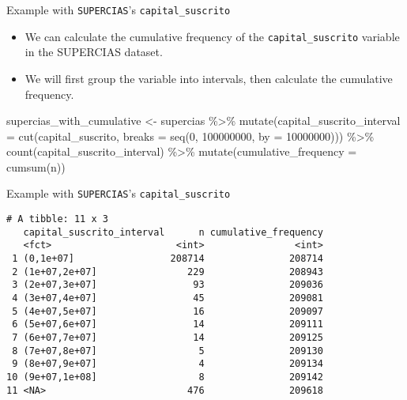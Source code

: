 \documentclass[
  10pt,
  ignorenonframetext,
]{beamer}
\newenvironment{Shaded}{\begin{snugshade}}{\end{snugshade}}
\newcommand{\AttributeTok}[1]{\textcolor[rgb]{0.40,0.45,0.13}{#1}}
\newcommand{\DecValTok}[1]{\textcolor[rgb]{0.68,0.00,0.00}{#1}}
\newcommand{\FunctionTok}[1]{\textcolor[rgb]{0.28,0.35,0.67}{#1}}
\newcommand{\NormalTok}[1]{\textcolor[rgb]{0.00,0.23,0.31}{#1}}
\newcommand{\OtherTok}[1]{\textcolor[rgb]{0.00,0.23,0.31}{#1}}
\newcommand{\SpecialCharTok}[1]{\textcolor[rgb]{0.37,0.37,0.37}{#1}}
\begin{document}
\begin{frame}[fragile]{Example with \texttt{SUPERCIAS}'s
\texttt{capital\_suscrito}}
\label{example-with-superciass-capital_suscrito}
\begin{itemize}
\item
  We can calculate the cumulative frequency of the
  \texttt{capital\_suscrito} variable in the SUPERCIAS dataset.
\item
  We will first group the variable into intervals, then calculate the
  cumulative frequency.
\end{itemize}

\begin{Shaded}
\begin{Highlighting}[]
\NormalTok{supercias\_with\_cumulative }\OtherTok{\textless{}{-}}
\NormalTok{    supercias }\SpecialCharTok{\%\textgreater{}\%} 
    \FunctionTok{mutate}\NormalTok{(}\AttributeTok{capital\_suscrito\_interval =} \FunctionTok{cut}\NormalTok{(capital\_suscrito, }\AttributeTok{breaks =} \FunctionTok{seq}\NormalTok{(}\DecValTok{0}\NormalTok{, }\DecValTok{100000000}\NormalTok{, }\AttributeTok{by =} \DecValTok{10000000}\NormalTok{))) }\SpecialCharTok{\%\textgreater{}\%} 
    \FunctionTok{count}\NormalTok{(capital\_suscrito\_interval) }\SpecialCharTok{\%\textgreater{}\%} 
    \FunctionTok{mutate}\NormalTok{(}\AttributeTok{cumulative\_frequency =} \FunctionTok{cumsum}\NormalTok{(n))}
\end{Highlighting}
\end{Shaded}
\end{frame}

\begin{frame}[fragile]{Example with \texttt{SUPERCIAS}'s
\texttt{capital\_suscrito}}
\label{example-with-superciass-capital_suscrito-1}
\begin{verbatim}
# A tibble: 11 x 3
   capital_suscrito_interval      n cumulative_frequency
   <fct>                      <int>                <int>
 1 (0,1e+07]                 208714               208714
 2 (1e+07,2e+07]                229               208943
 3 (2e+07,3e+07]                 93               209036
 4 (3e+07,4e+07]                 45               209081
 5 (4e+07,5e+07]                 16               209097
 6 (5e+07,6e+07]                 14               209111
 7 (6e+07,7e+07]                 14               209125
 8 (7e+07,8e+07]                  5               209130
 9 (8e+07,9e+07]                  4               209134
10 (9e+07,1e+08]                  8               209142
11 <NA>                         476               209618
\end{verbatim}
\end{frame}
\end{document}
